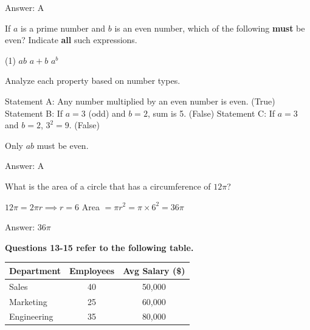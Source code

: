 \documentclass[11pt,paper=a4,answers]{exam}
\begin{document}
\begin{questions}
\begin{solution}
Answer: \colorbox{yellow!100}{A}
\end{solution}

\vspace{1cm}


\question
If $a$ is a prime number and $b$ is an even number, which of the following \textbf{must} be even?
Indicate \textbf{all} such expressions.

\begin{tasks}(1)
\task[A)] $ab$
\task[B)] $a + b$
\task[C)] $a^b$
\end{tasks}

\begin{solution}
Analyze each property based on number types.
\vspace{5pt}
\begin{center}
Statement A: Any number multiplied by an even number is even. (True)
\vspace{5pt}
Statement B: If $a=3$ (odd) and $b=2$, sum is 5. (False)
\vspace{5pt}
Statement C: If $a=3$ and $b=2$, $3^2 = 9$. (False)
\end{center}
Only $ab$ must be even.

Answer: \colorbox{yellow!100}{A}
\end{solution}

\vspace{1cm}


\question
What is the area of a circle that has a circumference of $12\pi$?

\begin{solution}
\begin{center}
$12\pi = 2\pi r \implies r = 6$
\vspace{5pt}
Area $= \pi r^2 = \pi \times 6^2 = 36\pi$
\end{center}

Answer: \colorbox{yellow!100}{$36\pi$}
\end{solution}

\vspace{1cm}

\textbf{Questions 13-15 refer to the following table.}
\begin{center}
\begin{tabular}{|l|c|c|}
\hline
\textbf{Department} & \textbf{Employees} & \textbf{Avg Salary (\$)} \\
\hline
Sales & 40 & 50,000 \\
Marketing & 25 & 60,000 \\
Engineering & 35 & 80,000 \\
\hline
\end{tabular}
\end{center}


\end{questions}
\end{document}
